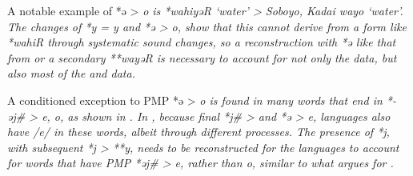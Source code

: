 A notable example of *ə > \it{o} is *wahiyəR ‘water’ > Soboyo, Kadai \it{wayo} ‘water’.
The changes of *y = \it{y}
and *ə > \it{o},
show that this cannot derive from a form like *wahiR through
systematic sound changes, so a reconstruction with
*ə like that from \citet{Wolff2010}
or a secondary **wayəR is necessary to account for not only the
 data, but also most of the  and  data.

\clearpage
A conditioned exception to PMP *ə > \it{o} is found in many words
that end in *-əj{\#} > \it{e,
o}, as shown in .
In , because final *j{\#} > {\0}
and *ə > \it{e},
 languages also have /e/ in these words,
albeit through different processes.
The presence of *j,
with subsequent *j > **y,
needs to be reconstructed for the  languages to
account for words that have PMP *əj{\#} > \it{e},
rather than \it{o}, similar to what \citet[76--77]{Mead2003b}
argues for .


